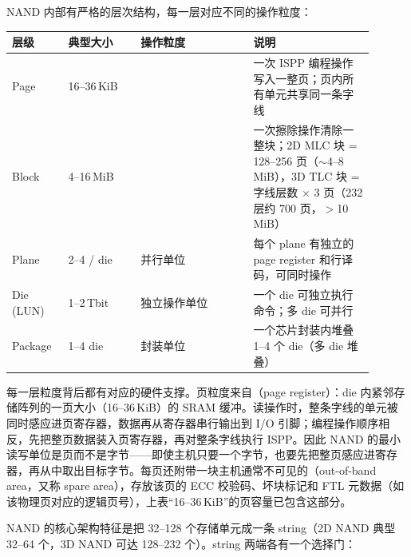 
NAND 内部有严格的层次结构，每一层对应不同的操作粒度：

\begin{longtable}{L{0.14\linewidth}L{0.18\linewidth}L{0.28\linewidth}L{0.3\linewidth}}
\toprule
层级 & 典型大小 & 操作粒度 & 说明 \\
\midrule
Page & 16--36\,KiB &  & 一次 ISPP 编程操作写入一整页；页内所有单元共享同一条字线 \\\tablerowrule
Block & 4--16\,MiB &  & 一次擦除操作清除一整块；2D MLC 块 = 128--256 页（$\sim$4--8\,MiB），3D TLC 块 = 字线层数 $\times$ 3 页（232 层约 700 页，$>$10\,MiB）\\\tablerowrule
Plane & 2--4 / die & 并行单位 & 每个 plane 有独立的 page register 和行译码，可同时操作 \\\tablerowrule
Die (LUN) & 1--2\,Tbit & 独立操作单位 & 一个 die 可独立执行命令；多 die 可并行 \\\tablerowrule
Package & 1--4 die & 封装单位 & 一个芯片封装内堆叠 1--4 个 die（多 die 堆叠） \\
\bottomrule
\end{longtable}

每一层粒度背后都有对应的硬件支撑。页粒度来自（page register）：die 内紧邻存储阵列的一页大小（16--36\,KiB）的 SRAM 缓冲。读操作时，整条字线的单元被同时感应进页寄存器，数据再从寄存器串行输出到 I/O 引脚；编程操作顺序相反，先把整页数据装入页寄存器，再对整条字线执行 ISPP。因此 NAND 的最小读写单位是页而不是字节——即使主机只要一个字节，也要先把整页感应进寄存器，再从中取出目标字节。每页还附带一块主机通常不可见的（out-of-band area，又称 spare area），存放该页的 ECC 校验码、坏块标记和 FTL 元数据（如该物理页对应的逻辑页号），上表“16--36\,KiB”的页容量已包含这部分。



NAND 的核心架构特征是把 32--128 个存储单元成一条 string（2D NAND 典型 32--64 个，3D NAND 可达 128--232 个）。string 两端各有一个选择门：


